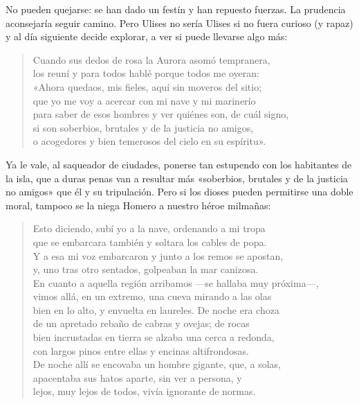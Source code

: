 \documentclass[11pt,a4paper]{article}
\begin{document}
No pueden quejarse: se han dado un festín y han repuesto fuerzas. La prudencia aconsejaría seguir camino. Pero Ulises no sería Ulises si no fuera curioso (y rapaz) y al día siguiente decide explorar, a ver si puede llevarse algo más:

\begin{verse}
Cuando sus dedos de rosa la Aurora asomó tempranera,\\
los reuní y para todos hablé porque todos me oyeran:\\
«Ahora quedaos, mis fieles, aquí sin moveros del sitio;\\
que yo me voy a acercar con mi nave y mi marinerío\\
para saber de esos hombres y ver quiénes son, de cuál signo,\\
si son soberbios, brutales y de la justicia no amigos,\\
o acogedores y bien temerosos del cielo en su espíritu».
\end{verse}

Ya le vale, al saqueador de ciudades, ponerse tan estupendo con los habitantes de la isla, que a duras penas van a resultar más «soberbios, brutales y de la justicia no amigos» que él y su tripulación. Pero si los dioses pueden permitirse una doble moral, tampoco se la niega Homero a nuestro héroe milmañas:

\begin{verse}
Esto diciendo, subí yo a la nave, ordenando a mi tropa\\
que se embarcara también y soltara los cables de popa.\\
Y a esa mi voz embarcaron y junto a los remos se apostan,\\
y, uno tras otro sentados, golpeaban la mar canizosa.\\
En cuanto a aquella región arribamos ---se hallaba muy próxima---,\\
vimos allá, en un extremo, una cueva mirando a las olas\\
bien en lo alto, y envuelta en laureles. De noche era choza\\
de un apretado rebaño de cabras y ovejas; de rocas\\
bien incrustadas en tierra se alzaba una cerca a redonda,\\
con largos pinos entre ellas y encinas altifrondosas.\\
De noche allí se encovaba un hombre gigante, que, a solas,\\
apacentaba sus hatos aparte, sin ver a persona, y\\
lejos, muy lejos de todos, vivía ignorante de normas.
\end{verse}
\end{document}
